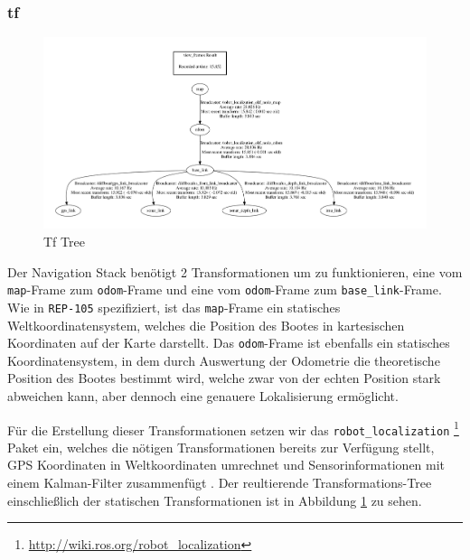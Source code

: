 \documentclass[11pt]{article}
\begin{document}
\subsubsection{tf}

\begin{figure}[h]
	\includegraphics[width=\linewidth]{frames.png}
	\caption{Tf Tree}
	\label{frames}
\end{figure}

Der Navigation Stack benötigt 2 Transformationen um zu funktionieren, eine vom \texttt{map}-Frame zum \texttt{odom}-Frame und eine vom \texttt{odom}-Frame zum \texttt{base\_link}-Frame. Wie in \texttt{REP-105} \cite{REP105} spezifiziert, ist das \texttt{map}-Frame ein statisches Weltkoordinatensystem, welches die Position des Bootes in kartesischen Koordinaten auf der Karte darstellt.  Das \texttt{odom}-Frame ist ebenfalls ein statisches Koordinatensystem, in dem durch Auswertung der Odometrie die theoretische Position des Bootes bestimmt wird, welche zwar von der echten Position stark abweichen kann, aber dennoch eine genauere Lokalisierung ermöglicht.

Für die Erstellung dieser Transformationen setzen wir das \texttt{robot\_localization} \footnote{\url{http://wiki.ros.org/robot_localization}} Paket ein, welches die nötigen Transformationen bereits zur Verfügung stellt, GPS Koordinaten in Weltkoordinaten umrechnet und Sensorinformationen mit einem Kalman-Filter zusammenfügt \cite{MooreStouchKeneralizedEkf2014}. Der reultierende Transformations-Tree einschließlich der statischen Transformationen ist in Abbildung \ref{frames} zu sehen.\\
\end{document}
